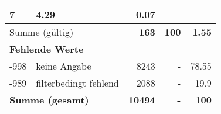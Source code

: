 \begin{longtable}{lXrrr}
       \num{7} &
       \num[round-mode=places,round-precision=2]{4,29} &
         \num[round-mode=places,round-precision=2]{0,07} \\
     \midrule
     \multicolumn{2}{l}{Summe (gültig)} &
       \textbf{\num{163}} &
     \textbf{100} &
       \textbf{\num[round-mode=places,round-precision=2]{1,55}} \\
     \multicolumn{5}{l}{\textbf{Fehlende Werte}}\\
       -998 &
       keine Angabe &
         \num{8243} &
        - &
         \num[round-mode=places,round-precision=2]{78,55} \\
       -989 &
       filterbedingt fehlend &
         \num{2088} &
        - &
         \num[round-mode=places,round-precision=2]{19,9} \\
     \midrule
     \multicolumn{2}{l}{\textbf{Summe (gesamt)}} &
          \textbf{\num{10494}} &
        \textbf{-} &
        \textbf{100} \\
     \bottomrule
     \end{longtable}
     
